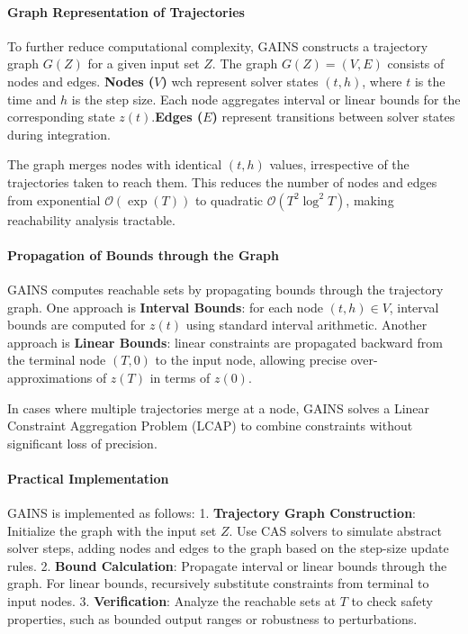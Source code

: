 \paragraph{Graph Representation of Trajectories}
To further reduce computational complexity, GAINS constructs a trajectory graph \(G(Z)\) for a given input set \(Z\). The graph \(G(Z) = (V, E)\) consists of nodes and edges. \textbf{Nodes (\(V\))} wch represent solver states \((t, h)\), where \(t\) is the time and \(h\) is the step size. Each node aggregates interval or linear bounds for the corresponding state \(z(t)\).\textbf{Edges (\(E\))} represent transitions between solver states during integration.

The graph merges nodes with identical \((t, h)\) values, irrespective of the trajectories taken to reach them. This reduces the number of nodes and edges from exponential \(\mathcal{O}(\exp(T))\) to quadratic \(\mathcal{O}(T^2 \log^2 T)\), making reachability analysis tractable.

\paragraph{Propagation of Bounds through the Graph}
GAINS computes reachable sets by propagating bounds through the trajectory graph. One approach is \textbf{Interval Bounds}: for each node \((t, h) \in V\), interval bounds are computed for \(z(t)\) using standard interval arithmetic. Another approach is \textbf{Linear Bounds}: linear constraints are propagated backward from the terminal node \((T, 0)\) to the input node, allowing precise over-approximations of \(z(T)\) in terms of \(z(0)\).

In cases where multiple trajectories merge at a node, GAINS solves a Linear Constraint Aggregation Problem (LCAP) to combine constraints without significant loss of precision.

\paragraph{Practical Implementation}
GAINS is implemented as follows:
1. \textbf{Trajectory Graph Construction}: Initialize the graph with the input set \(Z\). Use CAS solvers to simulate abstract solver steps, adding nodes and edges to the graph based on the step-size update rules.
2. \textbf{Bound Calculation}: Propagate interval or linear bounds through the graph. For linear bounds, recursively substitute constraints from terminal to input nodes.
3. \textbf{Verification}: Analyze the reachable sets at \(T\) to check safety properties, such as bounded output ranges or robustness to perturbations.


